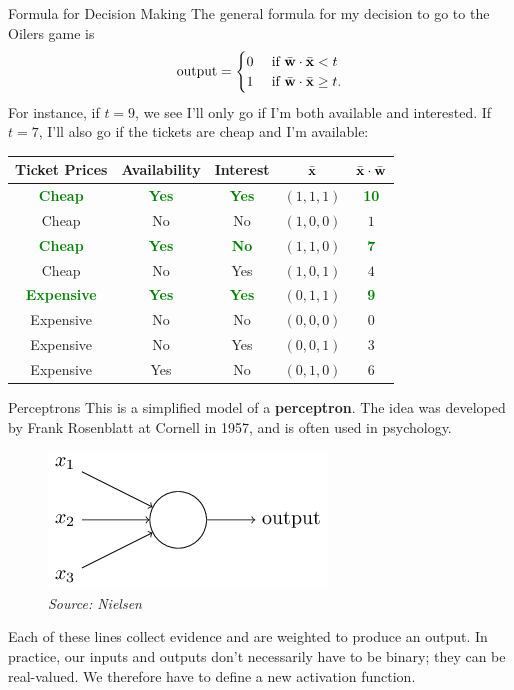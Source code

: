 \documentclass[xcolor=dvipsnames, fontsize=11pt, %
pagesize, %
parskip=half-, t]{beamer}
\begin{document}
\begin{frame}{Formula for Decision Making}
The general formula for my decision to go to the Oilers game is $$\text{output}=\begin{cases} 0 & \text{ if } \bar{\bold{w}}\cdot \bar{\bold{x}}<t \\ 
1 & \text{ if } \bar{\bold{w}}\cdot \bar{\bold{x}}\ge t. \end{cases}$$  
For instance, if $t=9$, we see I'll only go if I'm both available and interested.  If $t=7$, I'll also go if the tickets are cheap and I'm available:
\begin{table} 
\center 
\begin{tabular}{cccc|c}
Ticket Prices & Availability & Interest & $\bar{\bold{x}}$ & $\bar{\bold{x}}\cdot \bar{\bold{w}}$ \\ \hline 
\textbf{\textcolor{Green}{Cheap}} & \textbf{\textcolor{Green}{Yes}} & \textbf{\textcolor{Green}{Yes}} & $(1,1,1)$ & \textbf{\textcolor{Green}{10}} \\
Cheap & No & No & $(1,0,0)$ & $1$ \\
\textbf{\textcolor{Green}{Cheap }}& \textbf{\textcolor{Green}{Yes }}& \textbf{\textcolor{Green}{No}} & $(1,1,0)$ & \textbf{\textcolor{Green}{7}} \\
Cheap & No & Yes & $(1,0,1)$ & $4$   \\
\textbf{\textcolor{Green}{Expensive}} & \textbf{\textcolor{Green}{Yes}} & \textbf{\textcolor{Green}{Yes}} & $(0,1,1)$ & \textbf{\textcolor{Green}{9}} \\
Expensive & No & No & $(0,0,0)$  & $0$ \\
Expensive & No & Yes & $(0,0,1)$ & $3$\\
Expensive & Yes & No & $(0,1,0)$ & $6$
\end{tabular}
\end{table}
\end{frame}
\begin{frame}{Perceptrons}
This is a simplified model of a \textbf{perceptron}. The idea was developed by Frank Rosenblatt at Cornell in 1957, and is often used in psychology.  

\begin{figure}
\center
\includegraphics[scale=0.66]{perc.png}
\caption{\textit{Source: Nielsen}}
\end{figure} 
\vspace{0.05\textheight} 
Each of these lines collect evidence and are weighted to produce an output.  In practice, our inputs and outputs don't necessarily have to be binary; they can be real-valued. We therefore have to define a new activation function.
\end{frame}
\end{document}
